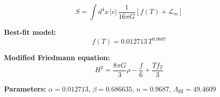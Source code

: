 
\begin{equation}
  S = \int d^4x \, |e| \, \frac{1}{16\pi G} \left[ f(T) + \mathcal{L}_m \right]
\end{equation}

\textbf{Best-fit model:}
\begin{equation}
  f(T) = 0.012713 \, T^{0.9687}
\end{equation}

\textbf{Modified Friedmann equation:}
\begin{equation}
  H^2 = \frac{8\pi G}{3} \rho - \frac{f}{6} + \frac{T f_T}{3}
\end{equation}

\textbf{Parameters:}
$\alpha = 0.012713$, \quad
$\beta = 0.686635$, \quad
$n = 0.9687$, \quad
$\Lambda_{\text{BI}} = 49.4609$